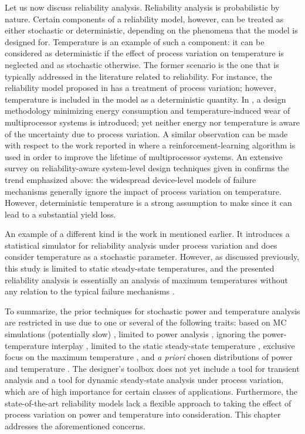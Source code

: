Let us now discuss reliability analysis. Reliability analysis is probabilistic
by nature. Certain components of a reliability model, however, can be treated as
either stochastic or deterministic, depending on the phenomena that the model is
designed for. Temperature is an example of such a component: it can be
considered as deterministic if the effect of process variation on temperature is
neglected and as stochastic otherwise. The former scenario is the one that is
typically addressed in the literature related to reliability. For instance, the
reliability model proposed in \cite{xiang2010} has a treatment of process
variation; however, temperature is included in the model as a deterministic
quantity. In \cite{das2014a}, a design methodology minimizing energy consumption
and temperature-induced wear of multiprocessor systems is introduced; yet
neither energy nor temperature is aware of the uncertainty due to process
variation. A similar observation can be made with respect to the work reported
in \cite{das2014c} where a reinforcement-learning algorithm is used in order to
improve the lifetime of multiprocessor systems. An extensive survey on
reliability-aware system-level design techniques given in \cite{das2014b}
confirms the trend emphasized above: the widespread device-level models of
failure mechanisms generally ignore the impact of process variation on
temperature. However, deterministic temperature is a strong assumption to make
since it can lead to a substantial yield loss.

An example of a different kind is the work in \cite{lee2013} mentioned earlier.
It introduces a statistical simulator for reliability analysis under process
variation and does consider temperature as a stochastic parameter. However, as
discussed previously, this study is limited to static steady-state temperatures,
and the presented reliability analysis is essentially an analysis of maximum
temperatures without any relation to the typical failure mechanisms
\cite{jedec2016}.

To summarize, the prior techniques for stochastic power and temperature analysis
are restricted in use due to one or several of the following traits: based on
\ac{MC} simulations (potentially slow) \cite{chandra2010}, limited to power
analysis \cite{bhardwaj2006, ghanta2006, vrudhula2006, bhardwaj2008, shen2009,
chandra2010}, ignoring the power-temperature interplay \cite{bhardwaj2006,
ghanta2006, vrudhula2006, bhardwaj2008, huang2009a, shen2009}, limited to the
static steady-state temperature \cite{huang2009a, juan2011, juan2012, lee2013},
exclusive focus on the maximum temperature \cite{juan2011}, and \emph{a priori}
chosen distributions of power and temperature \cite{bhardwaj2006,
srivastava2010, juan2012}. The designer's toolbox does not yet include a tool
for transient analysis and a tool for dynamic steady-state analysis under
process variation, which are of high importance for certain classes of
applications. Furthermore, the state-of-the-art reliability models lack a
flexible approach to taking the effect of process variation on power and
temperature into consideration. This chapter addresses the aforementioned
concerns.
